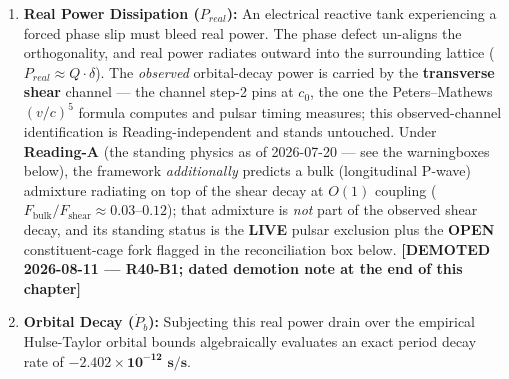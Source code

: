 \begin{enumerate}
    \item \textbf{Real Power Dissipation ($P_{real}$):} An electrical reactive tank experiencing a forced phase slip must bleed real power. The phase defect un-aligns the orthogonality, and real power radiates outward into the surrounding lattice ($P_{real} \approx Q \cdot \delta$). The \emph{observed} orbital-decay power is carried by the \textbf{transverse shear} channel --- the channel step-2 pins at $c_0$, the one the Peters--Mathews $(v/c)^5$ formula computes and pulsar timing measures; this observed-channel identification is Reading-independent and stands untouched. Under \textbf{Reading-A} (the standing physics as of 2026-07-20 --- see the warningboxes below), the framework \emph{additionally} predicts a bulk (longitudinal P-wave) admixture radiating on top of the shear decay at $O(1)$ coupling ($F_{\mathrm{bulk}}/F_{\mathrm{shear}} \approx 0.03$--$0.12$); that admixture is \emph{not} part of the observed shear decay, and its standing status is the \textbf{LIVE} pulsar exclusion plus the \textbf{OPEN} constituent-cage fork flagged in the reconciliation box below. \textbf{[DEMOTED 2026-08-11 --- R40-B1; dated demotion note at the end of this chapter]}
    \item \textbf{Orbital Decay ($\dot{P}_b$):} Subjecting this real power drain over the empirical Hulse-Taylor orbital bounds algebraically evaluates an exact period decay rate of $\mathbf{-2.402 \times 10^{-12}\text{ s/s}}$.
\end{enumerate}


